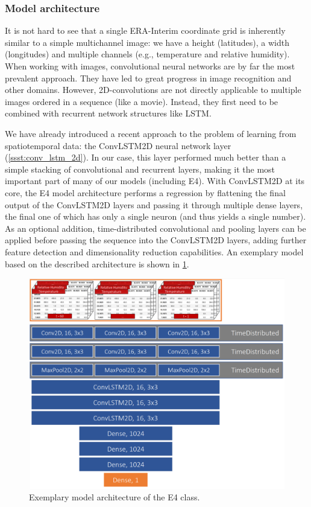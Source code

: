 \clearpage
\subsubsection{Model architecture}
It is not hard to see that a single ERA-Interim coordinate grid is inherently similar to a simple multichannel image: we have a height (latitudes), a width (longitudes) and multiple channels (e.g., temperature and relative humidity). When working with images, convolutional neural networks are by far the most prevalent approach. They have led to great progress in image recognition and other domains. However, 2D-convolutions are not directly applicable to multiple images ordered in a sequence (like a movie). Instead, they first need to be combined with recurrent network structures like LSTM.

We have already introduced a recent approach to the problem of learning from spatiotemporal data: the ConvLSTM2D neural network layer (\cref{ssst:conv_lstm_2d}). In our case, this layer performed much better than a simple stacking of convolutional and recurrent layers, making it the most important part of many of our models (including E4). With ConvLSTM2D at its core, the E4 model architecture performs a regression by flattening the final output of the ConvLSTM2D layers and passing it through multiple dense layers, the final one of which has only a single neuron (and thus yields a single number). As an optional addition, time-distributed convolutional and pooling layers can be applied before passing the sequence into the ConvLSTM2D layers, adding further feature detection and dimensionality reduction capabilities. An exemplary model based on the described architecture is shown in \cref{fig:e4_architecture}.

\begin{figure}[h]
  \centering
  \includegraphics[width=0.8\linewidth]{./99_appendix/img/E4_architecture}
  \caption{Exemplary model architecture of the E4 class.}
  \label{fig:e4_architecture}
\end{figure}

